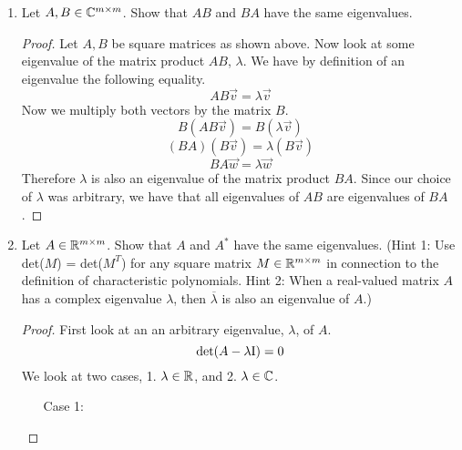 \documentclass{article}
\begin{document}
\begin{enumerate}
\begin{enumerate}
\begin{proof}
Take any $A \in \C^{m\times m}$ to be invertible. Then we have inverse, $A^{-1}$ exists such that, 
\[
    AA^{-1} = \mathrm{I}_m = A^{-1}A
\]
We also have by the fact that $\lambda \neq 0$ is an eigenvalue of $A$ that, 
\[
    \text{det}(A - \lambda\mathrm{I}_m) = 0
\]
We can substitute for $\I_m$.
\[
    \text{det}(A - \lambda\I_m) = \text{det}(A - \lambda(A^{-1}A)) = \text{det}(A)\text{det}(\I_m - \lambda A^{-1}) = 0 
\]
\[
    \text{det}(I_m - \lambda A^{-1}) = -\text{det}(A^{-1} - \frac{1}{\lambda}\I_m) = 0
\]
\[
    \text{det}(A^{-1} - \frac{1}{\lambda}\I_m) = 0
\]
Therefore, $\lambda^{-1}$ is an eigenvalue of $A^{-1}$.

\end{proof}


\item 
Let $A, B \in \mathbb{C}^{m\times m}$. Show that $AB$ and $BA$ have the same eigenvalues.

\begin{proof}

Let $A, B$ be square matrices as shown above. Now look at some eigenvalue of the matrix product $AB$, $\lambda$. We have by definition of an eigenvalue the following equality.
\[
    AB\vec{v} = \lambda\vec{v}
\]
Now we multiply both vectors by the matrix $B$.
\[
    B(AB\vec{v}) = B(\lambda\vec{v})
\]
\[
    (BA)(B\vec{v}) = \lambda(B\vec{v})  
\]
\[
    BA\vec{w} = \lambda\vec{w}
\]
Therefore $\lambda$ is also an eigenvalue of the matrix product $BA$. Since our choice of $\lambda$ was arbitrary, we have that all eigenvalues of $AB$ are eigenvalues of $BA$. 
\end{proof}


\item 
Let $A \in \mathbb{R}^{m \times m}$. Show that $A$ and $A^*$ have the same eigenvalues. (Hint 1: Use det($M$) = det($M^T$) for any square matrix $M \in \mathbb{R}^{m\times m}$ in connection to the definition of characteristic polynomials. Hint 2: When a real-valued matrix $A$ has a complex eigenvalue $\lambda$, then $\overline{\lambda}$ is also an eigenvalue of $A$.)

\begin{proof}
    
First look at an an arbitrary eigenvalue, $\lambda$, of $A$.
\[
    \text{det}(A - \lambda\mathrm{I}) = 0
\]
We look at two cases, 1. $\lambda \in \mathbb{R}$, and 2. $\lambda \in \mathbb{C}$. 

\begin{enumerate}

\item[Case 1:] 


\end{enumerate}
\end{proof}
\end{enumerate}
\end{enumerate}
\end{document}
